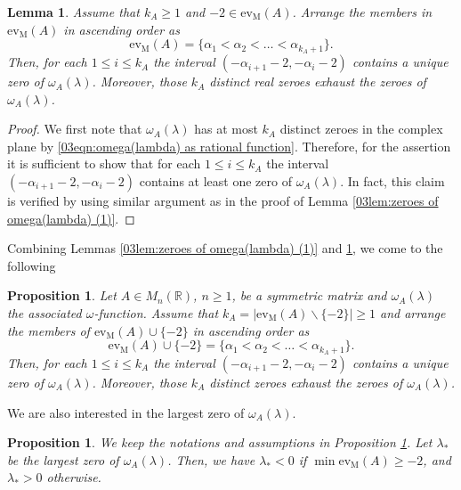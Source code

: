 \documentclass[12pt,a4paper]{article}
\newtheorem{proposition}[theorem]{Proposition}
\newtheorem{lemma}[theorem]{Lemma}
\newcommand{\1}{{\bm 1}}
\numberwithin{equation}{section}
\begin{document}
\begin{lemma}\label{03lem:zeroes of omega(lambda) (2)}
Assume that $k_A\ge1$ and $-2\in\mathrm{ev}_{\mathrm{M}}(A)$.
Arrange the members in $\mathrm{ev}_{\mathrm{M}}(A)$
in ascending order as
\[
\mathrm{ev}_{\mathrm{M}}(A)
=\{\alpha_1<\alpha_2<\dots<\alpha_{k_A+1}\}.
\]
Then, for each $1\le i\le k_A$ the interval
$(-\alpha_{i+1}-2,-\alpha_i-2)$
contains a unique zero of $\omega_A(\lambda)$.
Moreover, those $k_A$ distinct real zeroes
exhaust the zeroes of $\omega_A(\lambda)$.
\end{lemma}

\begin{proof}
We first note that $\omega_A(\lambda)$ has at most $k_A$
distinct zeroes in the complex plane by
\eqref{03eqn:omega(lambda) as rational function}.
Therefore, for the assertion it is sufficient to show that
for each $1\le i\le k_A$ the interval $(-\alpha_{i+1}-2,-\alpha_i-2)$
contains at least one zero of $\omega_A(\lambda)$.
In fact, this claim is verified by using similar argument as
in the proof of Lemma
\ref{03lem:zeroes of omega(lambda) (1)}.
\end{proof}


Combining Lemmas \ref{03lem:zeroes of omega(lambda) (1)} 
and \ref{03lem:zeroes of omega(lambda) (2)},
we come to the following 

\begin{proposition}\label{03prop:zeroes of omega(lambda) (3)}
Let $A\in M_n(\mathbb{R})$, $n\ge1$, be a symmetric matrix
and $\omega_A(\lambda)$ the associated $\omega$-function.
Assume that $k_A=|\mathrm{ev}_{\mathrm{M}}(A)\backslash\{-2\}|\ge1$
and arrange the members of $\mathrm{ev}_{\mathrm{M}}(A)\cup \{-2\}$
in ascending order as
%
\begin{equation}\label{03eqn:ascending order alpha}
\mathrm{ev}_{\mathrm{M}}(A)\cup \{-2\}
=\{\alpha_1<\alpha_2<\dots<\alpha_{k_A+1}\}.
\end{equation}
Then, for each $1\le i\le k_A$ the interval
$(-\alpha_{i+1}-2,-\alpha_i-2)$
contains a unique zero of $\omega_A(\lambda)$.
Moreover, those $k_A$ distinct zeroes exhaust the zeroes of
$\omega_A(\lambda)$.
\end{proposition}

We are also interested in the largest zero of $\omega_A(\lambda)$.

\begin{proposition}\label{03prop:max zero of omega}
We keep the notations and assumptions in Proposition
\ref{03prop:zeroes of omega(lambda) (3)}.
Let $\lambda_*$ be the largest zero of $\omega_A(\lambda)$.
Then, we have $\lambda_*<0$ if $\min\mathrm{ev}_{\mathrm{M}}(A)\ge -2$,
and $\lambda_*>0$ otherwise.
\end{proposition}
\end{document}
